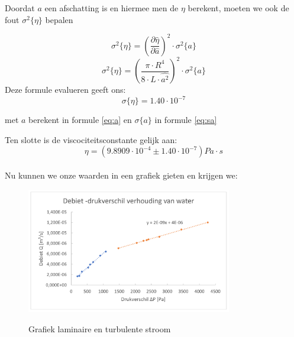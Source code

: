 Doordat $a$ een afschatting is en hiermee men de $\eta$ berekent,
moeten we ook de fout $\sigma ^2 \{ \eta \}$ bepalen

\begin{equation}
    \sigma ^2 \{ \eta \} = \left(\frac{\partial \hat{\eta}}{\partial \hat{a}}\right)^2 \cdot \sigma ^2 \{a\}
\end{equation}
\begin{equation*}
    \sigma ^2 \{ \eta \} = \left(\frac{\pi \cdot R^4}{8 \cdot L \cdot \hat{a^2}}\right)^2 \cdot \sigma ^2 \{a\}
\end{equation*}
Deze formule evalueren geeft ons:
\begin{equation*}
    \sigma \{ \eta \} = 1.40 \cdot 10^{-7}
\end{equation*}

met $a$ berekent in formule \eqref{eq:a} en $\sigma \{a\}$ in formule \eqref{eq:sa}

Ten slotte is de viscociteitsconstante gelijk aan:
\begin{equation*}
    \eta = (9.8909 \cdot 10^{-4} \pm 1.40 \cdot 10^{-7})Pa \cdot s
\end{equation*}\\

Nu kunnen we onze waarden in een grafiek gieten en krijgen we:

\begin{figure}[h]
    \centering
    \caption{Grafiek laminaire en turbulente stroom}
    \includegraphics[width=0.8\textwidth]{img/grafiek.png}
    \label{fig:grafiek}
\end{figure}



